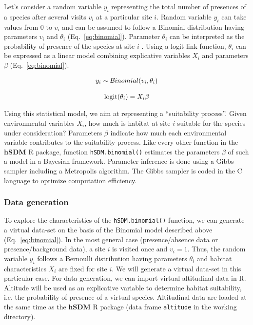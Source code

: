 \documentclass[a4paper, 12pt, leqno]{article}\usepackage[]{graphicx}\usepackage[]{color}
\newcommand{\logit}{\text{logit}}
\begin{document}
Let's consider a random variable $y_i$ representing the total number of presences of a
species after several visits $v_i$ at a particular site $i$. Random variable $y_i$ can
take values from 0 to $v_i$ and can be assumed to follow a Binomial distribution having
parameters $v_i$ and $\theta_i$ (Eq.~\ref{eq:binomial}). Parameter $\theta_i$ can be
interpreted as the probability of presence of the species at site $i$ . Using a logit link
function, $\theta_i$ can be expressed as a linear model combining explicative variables
$X_i$ and parameters $\beta$ (Eq.~\ref{eq:binomial}).

\begin{equation}
  \begin{tabular}{c}
    $y_i \sim \mathcal{B}inomial(v_i,\theta_i)$ \\
    ~ \\
    $\logit(\theta_i) = X_i \beta$ \\
  \end{tabular}
  \label{eq:binomial}
\end{equation}

Using this statistical model, we aim at representing a ``suitability process''. Given
environmental variables $X_i$, how much is habitat at site $i$ suitable for the species
under consideration? Parameters $\beta$ indicate how much each environmental variable
contributes to the suitability process. Like every other function in the \textbf{hSDM} R
package, function \texttt{hSDM.binomial()} estimates the parameters $\beta$ of such a
model in a Bayesian framework. Parameter inference is done using a Gibbs sampler including
a Metropolis algorithm. The Gibbs sampler is coded in the C language to optimize
computation efficiency.

\subsubsection{Data generation}

To explore the characteristics of the \texttt{hSDM.binomial()} function, we can generate a
virtual data-set on the basis of the Binomial model described above
(Eq.~\ref{eq:binomial}). In the most general case (presence/absence data or
presence/background data), a site $i$ is visited once and $v_i=1$. Thus, the random
variable $y_i$ follows a Bernoulli distribution having parameters $\theta_i$ and habitat
characteristics $X_i$ are fixed for site $i$. We will generate a virtual data-set in this
particular case. For data generation, we can import virtual altitudinal data in
R. Altitude will be used as an explicative variable to determine habitat suitability,
i.e. the probability of presence of a virtual species. Altitudinal data are loaded at the
same time as the \textbf{hSDM} R package (data frame \texttt{altitude} in the working
directory).
\end{document}
